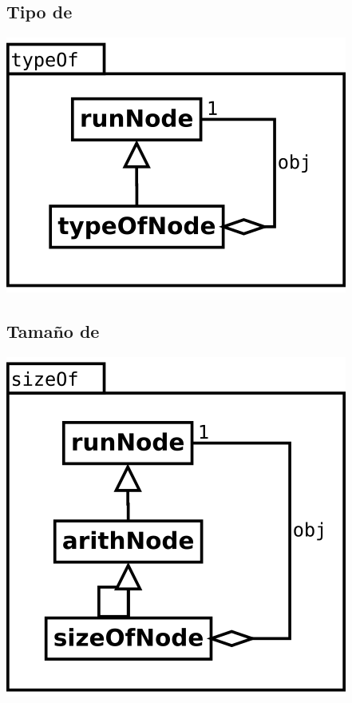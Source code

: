 \subsection {Tipo de} 
\begin{center}
\includegraphics[scale=0.4]{typeOf.png} \\
\end{center}

\subsection {Tamaño de} 
\begin{center}
\includegraphics[scale=0.4]{sizeOf.png} \\
\end{center}

